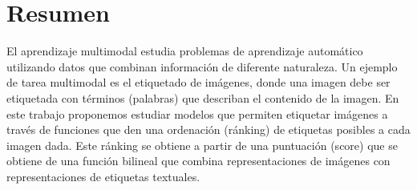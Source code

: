 \documentclass[12pt]{book}
\begin{document}








\chapter*{Resumen}

\pagestyle{plain}

El aprendizaje multimodal estudia problemas de aprendizaje automático utilizando datos que combinan información de diferente naturaleza. Un ejemplo de tarea multimodal es el etiquetado de imágenes, donde una imagen debe ser etiquetada con términos (palabras) que describan el contenido de la imagen.
En este trabajo proponemos estudiar modelos que permiten etiquetar imágenes a través de funciones que den una ordenación (ránking) de etiquetas posibles a cada imagen dada. Este ránking se obtiene a partir de una puntuación (score) que se obtiene de una función bilineal que combina representaciones de imágenes con representaciones de etiquetas textuales.


\tableofcontents


\mainmatter %
\pagestyle{headings}
\end{document}
